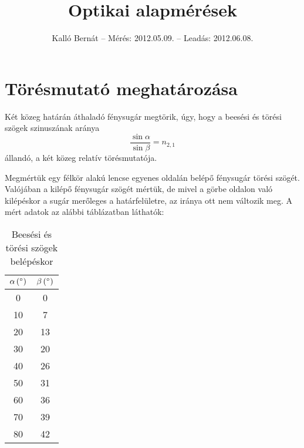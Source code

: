 \documentclass[12pt]{article}
\title{Optikai alapmérések}
\author{Kalló Bernát -- Mérés: 2012.05.09. -- Leadás: 2012.06.08.}
\date{}
\begin{document}
\def\tnagy{\ensuremath{t_{\text{nagy}}}}\def\tkicsi{\ensuremath{t_{\text{kicsi}}}}\def\xnagy{\ensuremath{x_{\text{nagy}}}}\def\xkicsi{\ensuremath{x_{\text{kicsi}}}}\def\gnagy{\ensuremath{g_{\text{nagy}}}}\def\gkicsi{\ensuremath{g_{\text{kicsi}}}}\def\Deltagnagy{\ensuremath{\Delta{}g_{\text{nagy}}}}\def\Deltagkicsi{\ensuremath{\Delta{}g_{\text{kicsi}}}}\def\geff{\ensuremath{g_\text{eff}}}

\maketitle

\section{Törésmutató meghatározása}

Két közeg határán áthaladó fénysugár megtörik, úgy, hogy a beesési és törési szögek szinuszának aránya \[\frac{\sin\alpha}{\sin\beta} = n_{2,1}\] állandó, a két közeg relatív törésmutatója.

Megmértük egy félkör alakú lencse egyenes oldalán belépő fénysugár törési szögét. Valójában a kilépő fénysugár szögét mértük, de mivel a görbe oldalon való kilépéskor a sugár merőleges a határfelületre, az iránya ott nem változik meg. A mért adatok az alábbi táblázatban láthatók:

  
  \begin{table}[H]
    \begin{center}
      \begin{tabular}{|
c|
c|
}
        \hline
        
\ensuremath{\unit[\text{\ensuremath{\alpha}}]{({}^\circ)}} & 
\ensuremath{\unit[\text{\ensuremath{\beta}}]{({}^\circ)}}
\\
        \hline\hline
        
0
 & 0
\\
        \hline
        
10
 & 7
\\
        \hline
        
20
 & 13
\\
        \hline
        
30
 & 20
\\
        \hline
        
40
 & 26
\\
        \hline
        
50
 & 31
\\
        \hline
        
60
 & 36
\\
        \hline
        
70
 & 39
\\
        \hline
        
80
 & 42
\\
        \hline
      \end{tabular}
      \caption{Beesési és törési szögek belépéskor}
      \label{tab:}
    \end{center}
  \end{table}
\end{document}

